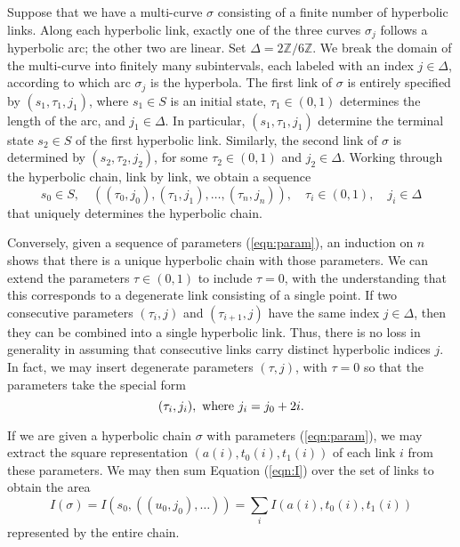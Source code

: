 \documentclass[11pt]{amsart}
\newcommand{\ring}[1]{\mathbb{#1}}
\def\ta{{\tau}}
\begin{document}
 Suppose that we have a multi-curve $\sigma$
consisting of a finite number of hyperbolic links.    Along each hyperbolic link,
exactly one of the three curves $\sigma_j$ follows a hyperbolic arc;
the other two are linear.  Set $\Delta=2\ring{Z}/6\ring{Z}$.
We break the domain of the multi-curve
into finitely many subintervals, each labeled with an index
$j\in\Delta$, according to which arc $\sigma_j$ is the hyperbola.
The first link of $\sigma$
is entirely specified by $(s_1,\ta_1,j_1)$, where $s_1\in S$ is an initial state,
$\ta_1\in(0,1)$ determines the length of the arc, and $j_1\in\Delta$.  
In particular, $(s_1,\ta_1,j_1)$
determine the terminal state $s_2\in S$
of the first hyperbolic link.  Similarly, 
the second link of $\sigma$ is determined
by $(s_2,\ta_2,j_2)$, for some $\ta_2\in (0,1)$ and $j_2\in\Delta$.  Working through the hyperbolic
chain, link by link, we obtain a sequence
\begin{equation}\label{eqn:param}
  s_0\in S,\quad ((\ta_0,j_0),(\ta_1,j_1),\ldots,(\ta_n,j_n)),\quad \ta_i\in(0,1),\quad j_i\in\Delta
\end{equation}
that uniquely determines the hyperbolic chain.

Conversely, given a sequence of parameters (\ref{eqn:param}),
an  induction on $n$ shows that there is a unique hyperbolic chain
with those parameters.  
We can extend the parameters $\ta\in (0,1)$ to include $\ta=0$,
with the understanding that this corresponds to a degenerate link consisting of a single point.  If two consecutive parameters $(\ta_i,j)$ and 
$(\ta_{i+1},j)$ have the same index $j\in\Delta$, then they can be
combined into a single hyperbolic link.  Thus, there is no loss in
generality in assuming that consecutive 
links carry distinct hyperbolic indices $j$.  In fact,
we may insert degenerate parameters $(\ta,j)$, with $\ta=0$ so that
the parameters take the special form
\begin{equation}\label{eqn:ji}
  (\ta_i,j_i),\hbox{ where } j_i = j_0 + 2 i.
\end{equation}

If we are given a hyperbolic chain $\sigma$ 
with parameters (\ref{eqn:param}),
we may extract the square representation $(a(i),t_0(i),t_1(i))$
of each
link $i$ from these parameters.  We may then sum Equation (\ref{eqn:I})
over the set of links to obtain the area
\begin{equation}\label{eqn:Isigma}
I(\sigma) = I(s_0,((u_0,j_0),\ldots)) = \sum_i I(a(i),t_0(i),t_1(i))
\end{equation}
represented by the entire chain.
\end{document}
